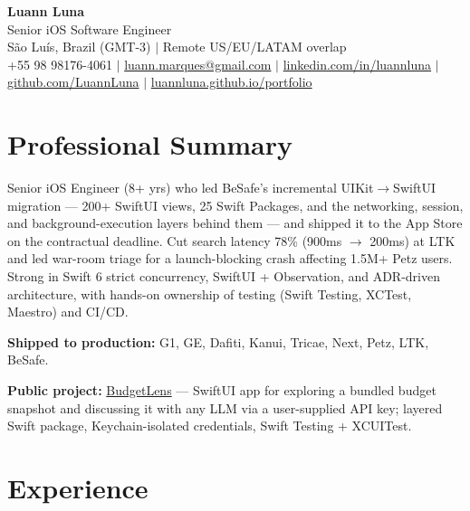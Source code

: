 \documentclass[11pt,letterpaper]{article}
\begin{document}
\begin{center}
    {\LARGE \textbf{Luann Luna}} \\
    \vspace{0.4em}
    Senior iOS Software Engineer \\
    \vspace{0.2em}
    São Luís, Brazil (GMT-3) $|$ Remote US/EU/LATAM overlap \\
    \vspace{0.3em}
    +55 98 98176-4061 $|$
    \href{mailto:luann.marques@gmail.com}{luann.marques@gmail.com} $|$
    \href{https://linkedin.com/in/luannluna}{linkedin.com/in/luannluna} $|$
    \href{https://github.com/LuannLuna}{github.com/LuannLuna} $|$
    \href{https://luannluna.github.io/portfolio/}{luannluna.github.io/portfolio}
\end{center}

\vspace{0.4em}

\section*{Professional Summary}
Senior iOS Engineer (8+ yrs) who led BeSafe's incremental UIKit$\rightarrow$SwiftUI migration --- 200+ SwiftUI views, 25 Swift Packages, and the networking, session, and background-execution layers behind them --- and shipped it to the App Store on the contractual deadline. Cut search latency 78\% (900ms $\rightarrow$ 200ms) at LTK and led war-room triage for a launch-blocking crash affecting 1.5M+ Petz users. Strong in Swift 6 strict concurrency, SwiftUI + Observation, and ADR-driven architecture, with hands-on ownership of testing (Swift Testing, XCTest, Maestro) and CI/CD.

\vspace{0.3em}
\noindent\textbf{Shipped to production:} G1, GE, Dafiti, Kanui, Tricae, Next, Petz, LTK, BeSafe.

\vspace{0.3em}
\noindent\textbf{Public project:} \href{https://github.com/LuannLuna/BudgetLens}{BudgetLens} --- SwiftUI app for exploring a bundled budget snapshot and discussing it with any LLM via a user-supplied API key; layered Swift package, Keychain-isolated credentials, Swift Testing + XCUITest.

\section*{Experience}
\end{document}
